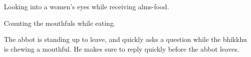 \begin{exam}{\autoExamName}
\begin{problem*}
\begin{parts}
    \bigskip

    \item {} Looking into a women's eyes while receiving alms-food.

    \bigskip

    \item {} Counting the mouthfuls while eating.

    \bigskip

    \item {} The abbot is standing up to leave, and quickly asks a question
      while the bhikkhu is chewing a mouthful. He makes sure to reply quickly
      before the abbot leaves.

    \end{parts}

  \end{problem*}

\end{exam}
